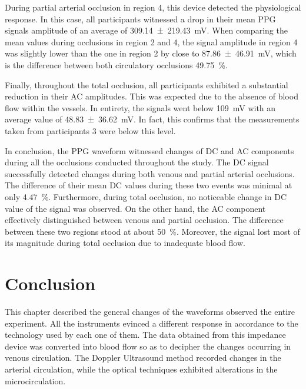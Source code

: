 During partial arterial occlusion in region 4, this device detected the physiological response. In this case, all participants witnessed a drop in their mean PPG signals amplitude of an average of \SI{309.14(21943)}{\milli\volt}. When comparing the mean values during occlusions in region 2 and 4, the signal amplitude in region 4 was slightly lower than the one in region 2 by close to \SI{87.86(4691)}{\milli\volt}, which is the difference between both circulatory occlusions \SI{49.75}{\percent}.

Finally, throughout the total occlusion, all participants exhibited a substantial reduction in their AC amplitudes. This was expected due to the absence of blood flow within the vessels. In entirety, the signals went below \SI{109}{\milli\volt} with an average value of \SI{48.83(3662)}{\milli\volt}. In fact, this confirms that the measurements taken from participants 3 were below this level. 

In conclusion, the PPG waveform witnessed changes of DC and AC components during all the occlusions conducted throughout the study. The DC signal successfully detected changes during both venous and partial arterial occlusions. The difference of their mean DC values during these two events was minimal at only \SI{4.47}{\percent}. Furthermore, during total occlusion, no noticeable change in DC value of the signal was observed.  On the other hand, the AC component effectively distinguished between venous and partial occlusion. The difference between these two regions stood at about \SI{50}{\percent}. Moreover, the signal lost most of its magnitude during total occlusion due to inadequate blood flow.

\section{Conclusion}
\label{section comparison 5}
This chapter described the general changes of the waveforms observed the entire experiment. All the instruments evinced a different response in accordance to the technology used by each one of them. The data obtained from this impedance device was converted into blood flow so as to decipher the changes occurring in venous circulation. The Doppler Ultrasound method recorded changes in the arterial circulation, while the optical techniques exhibited alterations in the microcirculation. 

